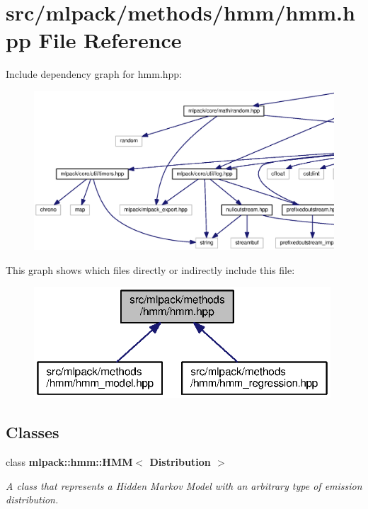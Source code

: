 \section{src/mlpack/methods/hmm/hmm.hpp File Reference}
\label{hmm_8hpp}
Include dependency graph for hmm.\+hpp\+:
\nopagebreak
\begin{figure}[H]
\begin{center}
\leavevmode
\includegraphics[width=350pt]{hmm_8hpp__incl}
\end{center}
\end{figure}
This graph shows which files directly or indirectly include this file\+:
\nopagebreak
\begin{figure}[H]
\begin{center}
\leavevmode
\includegraphics[width=314pt]{hmm_8hpp__dep__incl}
\end{center}
\end{figure}
\subsection*{Classes}
\begin{DoxyCompactItemize}
\item 
class {\bf mlpack\+::hmm\+::\+H\+M\+M$<$ Distribution $>$}
\begin{DoxyCompactList}\small\item\em A class that represents a Hidden Markov Model with an arbitrary type of emission distribution. \end{DoxyCompactList}\end{DoxyCompactItemize}
